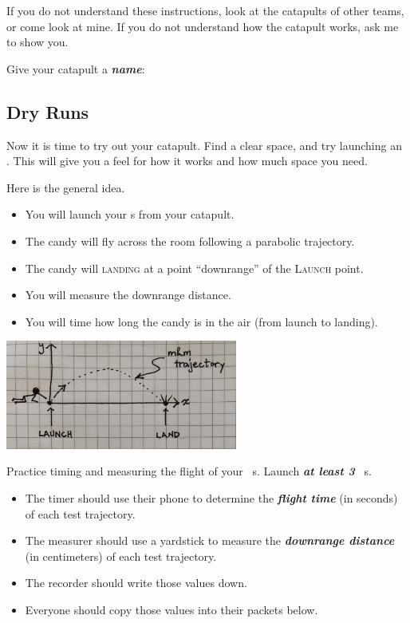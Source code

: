 If you do not understand these instructions, look at the catapults of other teams, or come look at mine.
If you do not understand how the catapult works, ask me to show you.

Give your catapult a {\bfseries\itshape name}: \fbox{\phantom{\LARGE Xxxxxx Xxxxxx-Xxxxxx}}

\subsection{Dry Runs}

Now it is time to try out your catapult. 
Find a clear space, and try launching an \mymm. 
This will give you a feel for how it works and how much space you need.

Here is the general idea.
\begin{itemize}[nosep]
    \item You will launch your \mymm{}s from your catapult.
    \item The candy will fly across the room following a parabolic trajectory.
    \item The candy will {\scshape landing} at a point ``downrange'' of the {\scshape Launch} point.
    \item You will measure the downrange distance.
    \item You will time how long the candy is in the air (from launch to landing).
\end{itemize}

\begin{center}
\includegraphics[width=3in]{../launch-and-landing.jpg}
\end{center}

Practice timing and measuring the flight of your \mymm~s. 
Launch {\bfseries\itshape at least 3} \mymm~s. 
\begin{itemize}[nosep]
    \item The timer should use their phone to determine 
        the {\bfseries\itshape flight time} (in seconds) of each test trajectory.
    \item The measurer should use a yardstick to measure 
        the {\bfseries\itshape downrange distance} (in centimeters) of each test trajectory.
    \item The recorder should write those values down.
    \item Everyone should copy those values into their packets below.
\end{itemize}


